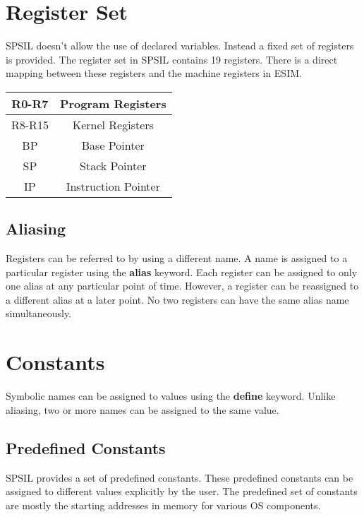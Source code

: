 \documentclass[11pt]{article}
\begin{document}
\section{Register Set}

SPSIL doesn't allow the use of declared variables. Instead a fixed set of registers is provided. The register set in SPSIL contains 19 registers. There is a direct mapping between these registers and the machine registers in ESIM.   \\

\begin{tabular}{| c | c | }
\hline
R0-R7 & Program Registers \\
\hline
R8-R15 & Kernel Registers \\
\hline
BP 		& Base Pointer \\
\hline
SP		& Stack Pointer \\
\hline
IP		& Instruction Pointer \\
\hline
\end{tabular}


\subsection{Aliasing}
Registers can be referred to by using a different name. A name is assigned to a particular register using the \textbf{alias} keyword. Each register can be assigned to only one alias at any particular point of time. However, a  register can be reassigned to a different alias at a later point. No two registers can have the same alias name simultaneously.



\section{Constants}
Symbolic names can be assigned to values using the \textbf{define} keyword. Unlike aliasing, two or more names can be assigned to the same value. 

\subsection{Predefined Constants}
SPSIL provides a set of predefined constants. These predefined constants can be assigned to different values explicitly by the user.  The predefined set of constants are mostly the starting addresses in memory for various OS components.
\end{document}
